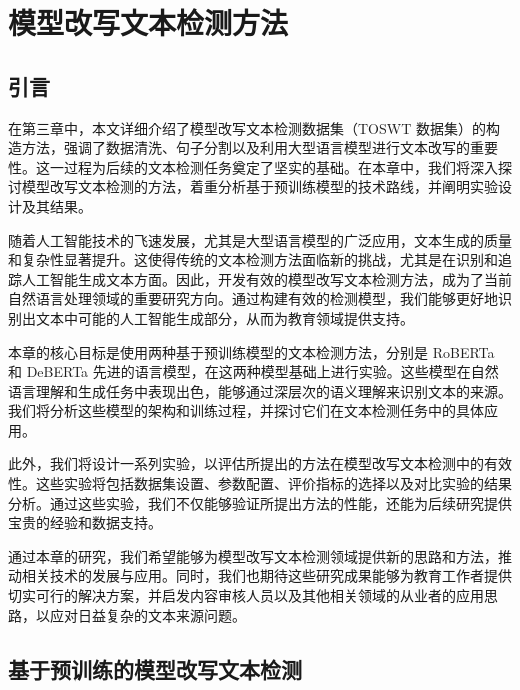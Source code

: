 
\chapter{模型改写文本检测方法}
\label{chap:method}

\section{引言}
\label{sec:method-intro}

在第三章中，本文详细介绍了模型改写文本检测数据集（TOSWT 数据集）的构造方法，强调了数据清洗、句子分割以及利用大型语言模型进行文本改写的重要性。这一过程为后续的文本检测任务奠定了坚实的基础。在本章中，我们将深入探讨模型改写文本检测的方法，着重分析基于预训练模型的技术路线，并阐明实验设计及其结果。

随着人工智能技术的飞速发展，尤其是大型语言模型的广泛应用，文本生成的质量和复杂性显著提升。这使得传统的文本检测方法面临新的挑战，尤其是在识别和追踪人工智能生成文本方面。因此，开发有效的模型改写文本检测方法，成为了当前自然语言处理领域的重要研究方向。通过构建有效的检测模型，我们能够更好地识别出文本中可能的人工智能生成部分，从而为教育领域提供支持。

本章的核心目标是使用两种基于预训练模型的文本检测方法，分别是 RoBERTa 和 DeBERTa 先进的语言模型，在这两种模型基础上进行实验。这些模型在自然语言理解和生成任务中表现出色，能够通过深层次的语义理解来识别文本的来源。我们将分析这些模型的架构和训练过程，并探讨它们在文本检测任务中的具体应用。

此外，我们将设计一系列实验，以评估所提出的方法在模型改写文本检测中的有效性。这些实验将包括数据集设置、参数配置、评价指标的选择以及对比实验的结果分析。通过这些实验，我们不仅能够验证所提出方法的性能，还能为后续研究提供宝贵的经验和数据支持。

通过本章的研究，我们希望能够为模型改写文本检测领域提供新的思路和方法，推动相关技术的发展与应用。同时，我们也期待这些研究成果能够为教育工作者提供切实可行的解决方案，并启发内容审核人员以及其他相关领域的从业者的应用思路，以应对日益复杂的文本来源问题。

\section{基于预训练的模型改写文本检测}
\label{sec:method-pretrain}

